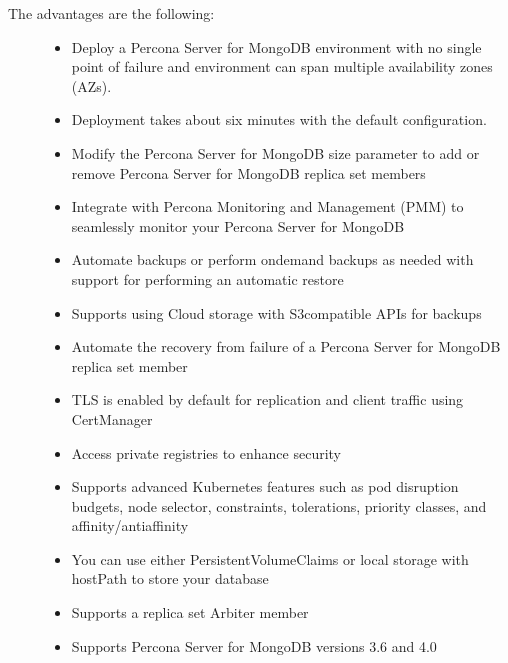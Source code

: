 \documentclass[letterpaper,10pt,english]{sphinxmanual}
\begin{document}
\begin{description}
\item[{The advantages are the following:}] \leavevmode\begin{itemize}
\item {} 
Deploy a Percona Server for MongoDB environment with no single point of failure and environment can span multiple availability zones (AZs).

\item {} 
Deployment takes about six minutes with the default configuration.

\item {} 
Modify the Percona Server for MongoDB size parameter to add or remove Percona Server for MongoDB replica set members

\item {} 
Integrate with Percona Monitoring and Management (PMM) to seamlessly monitor your Percona Server for MongoDB

\item {} 
Automate backups or perform on\sphinxhyphen{}demand backups as needed with support for performing an automatic restore

\item {} 
Supports using Cloud storage with S3\sphinxhyphen{}compatible APIs for backups

\item {} 
Automate the recovery from failure of a Percona Server for MongoDB replica set member

\item {} 
TLS is enabled by default for replication and client traffic using Cert\sphinxhyphen{}Manager

\item {} 
Access private registries to enhance security

\item {} 
Supports advanced Kubernetes features such as pod disruption budgets, node selector, constraints, tolerations, priority classes, and affinity/anti\sphinxhyphen{}affinity

\item {} 
You can use either PersistentVolumeClaims or local storage with hostPath to store your database

\item {} 
Supports a replica set Arbiter member

\item {} 
Supports Percona Server for MongoDB versions 3.6 and 4.0

\end{itemize}

\end{description}
\end{document}
